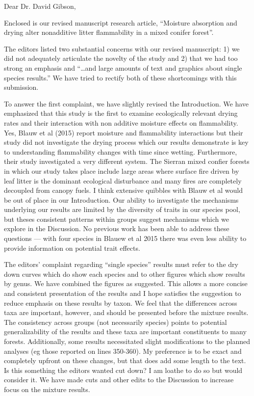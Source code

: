 \documentclass[letterpaper, 12pt]{letter}
\begin{document}
\begin{letter}{}

\opening{Dear Dr. David Gibson,}

Enclosed is our revised manuscript research article, ``Moisture absorption and drying alter nonadditive litter flammability in a mixed conifer forest''.

The editors listed two substantial concerns with our revised manuscript: 1) we did not adequately articulate the novelty of the study and 2) that we had too strong an emphasis and ``\ldots and large amounts of text and graphics about single species results.'' We have tried to rectify both of these shortcomings with this submission. 

To answer the first complaint, we have slightly revised the Introduction. We have emphasized that this study is the first to examine ecologically relevant drying rates and their interaction with non additive moisture effects on flammability. Yes, Blauw et al (2015) report moisture and flammability interactions but their study did not investigate the drying process which our results demonstrate is key to understanding flammability changes with time since wetting. Furthermore, their study investigated a very different system. The Sierran mixed confier forests in which our study takes place include large areas where surface fire driven by leaf litter is the dominant ecological disturbance and many fires are completely decoupled from canopy fuels. I think extensive quibbles with Blauw et al would be out of place in our Introduction. Our ability to investigate the mechanisms underlying our results are limited by the diversity of traits in our species pool, but theses consistent patterns within groups suggest mechanisms which we explore in the Discussion. No previous work has been able to address these questions --- with four species in Blauew et al 2015 there was even less ability to provide information on potential trait effects.

The editors' complaint regarding ``single species'' results must refer to the dry down curves which do show each species and to other figures which show results by genus. We have combined the figures as suggested. This allows a more concise and consistent presentation of the results and I hope satisfies the suggestion to reduce emphasis on these results by taxon. We feel that the differences across taxa are important, however, and should be presented before the mixture results. The consistency across groups (not necessarily species) points to potential generalizability of the results and these taxa are important constituents to many forests. Additionally, some results necessitated slight modifications to the planned analyses (eg those reported on lines 350-360). My preference is to be exact and completely upfront on these changes, but that does add some length to the text. Is this something the editors wanted cut down? I am loathe to do so but would consider it. We have made cuts and other edits to the Discussion to increase focus on the mixture results.


\end{letter}
\end{document}
